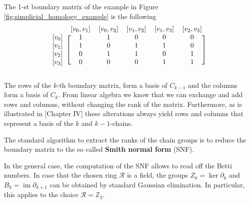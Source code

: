 The 1-st boundary matrix of the example in Figure \ref{fig:simplicial_homology_example} is the following \[
\begin{blockarray}{cccccc}
\label{mat:small}
& [v_0,v_1] & [v_0,v_2] & [v_1,v_2] & [v_1,v_3] & [v_2,v_3]\\
\begin{block}{c[ccccc]}
  \left[v_0\right]  & 1 & 1 & 0 & 0 & 0\\*
  \left[v_1\right]  & 1 & 0 & 1 & 1 & 0\\*
  \left[v_2\right]  & 0 & 1 & 1 & 0 & 1\\*
  \left[v_3\right]  & 0 & 0 & 0 & 1 & 1\\*
\end{block}
\end{blockarray}
\]

The rows of the $k$-th boundary matrix, form a basis of $C_{k-1}$ and the columns form a basis of $C_k$. From linear algebra we know that we can exchange and add rows and columns, without changing the rank of the matrix. Furthermore, as is illustrated in \cite{Computational+Topology}[Chapter IV] these alterations always yield rows and columns that represent a basis of the $k$ and $k-1$-chains.

The standard algorithm to extract the ranks of the chain groups is to reduce the boundary matrix to the so called \textbf{Smith normal form} (SNF). 

In the general case, the computation of the SNF allows to read off the Betti numbers. In case that the chosen ring $\mathcal{R}$ is a field, the groups $Z_k = \operatorname{ker}\partial_k$ and $B_k = \operatorname{im}\partial_{k+1}$ can be obtained by standard Gaussian elimination. In particular, this applies to the choice $\mathcal{R} = \mathbb{Z}_2$.

